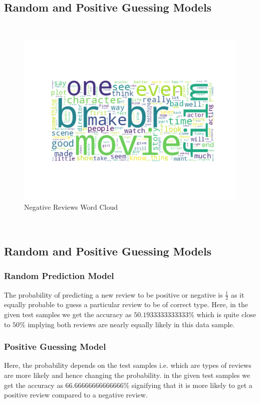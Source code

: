 \documentclass[11pt]{article}
\begin{document}
\subsection{Random and Positive Guessing Models}
\\
\begin{figure}[H]
  \includegraphics[width=\linewidth]{NegativeWordCloud.png}
  \caption{Negative Reviews Word Cloud}
  \label{fig1A}
\end{figure}
\\

\subsection{Random and Positive Guessing Models}

\subsubsection{Random Prediction Model}
The probability of predicting a new review to be positive or negative is $\frac{1}{2}$ as it equally probable to guess a particular review to be of correct type.  Here, in the given test samples we get the accuracy as $50.1933333333333\%$ which is quite close to $50\%$ implying both reviews are nearly equally likely in this data sample. 

\subsubsection{Positive Guessing Model}
Here, the probability depends on the test samples i.e. which are types of reviews are more likely and hence changing the probability. in the given test samples we get the accuracy as $66.66666666666666\%$ signifying that it is more likely to get a positive review compared to a negative review.
\end{document}
